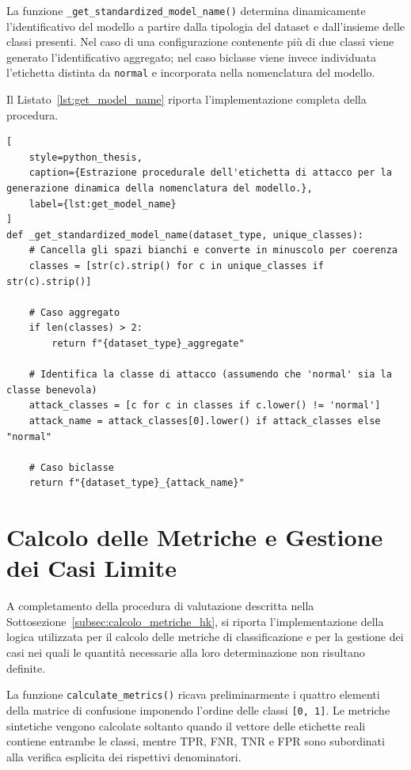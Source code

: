 La funzione \texttt{\_get\_standardized\_model\_name()} determina dinamicamente l'identificativo del modello a partire dalla tipologia del dataset e dall'insieme delle classi presenti. 
Nel caso di una configurazione contenente più di due classi viene generato l'identificativo aggregato; nel caso biclasse viene invece individuata l'etichetta distinta da \texttt{normal} e incorporata nella nomenclatura del modello.

Il Listato~\ref{lst:get_model_name} riporta l'implementazione completa della procedura.

\begin{lstlisting}[
    style=python_thesis,
    caption={Estrazione procedurale dell'etichetta di attacco per la generazione dinamica della nomenclatura del modello.},
    label={lst:get_model_name}
]
def _get_standardized_model_name(dataset_type, unique_classes):
    # Cancella gli spazi bianchi e converte in minuscolo per coerenza
    classes = [str(c).strip() for c in unique_classes if str(c).strip()]

    # Caso aggregato
    if len(classes) > 2:
        return f"{dataset_type}_aggregate"
    
    # Identifica la classe di attacco (assumendo che 'normal' sia la classe benevola)
    attack_classes = [c for c in classes if c.lower() != 'normal']
    attack_name = attack_classes[0].lower() if attack_classes else "normal"
    
    # Caso biclasse
    return f"{dataset_type}_{attack_name}"
\end{lstlisting}



\section{Calcolo delle Metriche e Gestione dei Casi Limite}
\label{app:calcolo_metriche}

A completamento della procedura di valutazione descritta nella Sottosezione~\ref{subsec:calcolo_metriche_hk}, si riporta l'implementazione della logica utilizzata per il calcolo delle metriche di classificazione e per la gestione dei casi nei quali le quantità necessarie alla loro determinazione non risultano definite.

La funzione \texttt{calculate\_metrics()} ricava preliminarmente i quattro elementi della matrice di confusione imponendo l'ordine delle classi \texttt{[0, 1]}. 
Le metriche sintetiche vengono calcolate soltanto quando il vettore delle etichette reali contiene entrambe le classi, mentre TPR, FNR, TNR e FPR sono subordinati alla verifica esplicita dei rispettivi denominatori.

